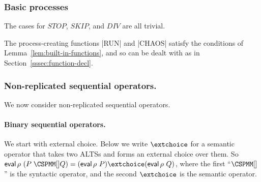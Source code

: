 

\subsubsection{Basic processes}  
\label{sec:basic-procs}

The cases for $STOP$, $SKIP$, and $DIV$ are all trivial.

The process-creating functions |RUN| and |CHAOS| satisfy the conditions of
Lemma~\ref{lem:built-in-functions}, and so can be dealt with as in
Section~\ref{sssec:function-decl}. 





\subsubsection{Non-replicated sequential operators.}
\label{sec:sequential-procs}

We now consider non-replicated sequential operators.  

\paragraph{Binary sequential operators.}

We start with external choice.
%
Below we write $\extchoice$ for a semantic operator that takes two ALTSs and
forms an external choice over them.  
So $\eval \rho~(P\; \M{[]} Q) = (\eval \rho~P) \extchoice (\eval \rho~Q)$,
where the first ``$\M{[]}$'' is the syntactic operator, and the second
$\extchoice$ is the semantic operator.  

